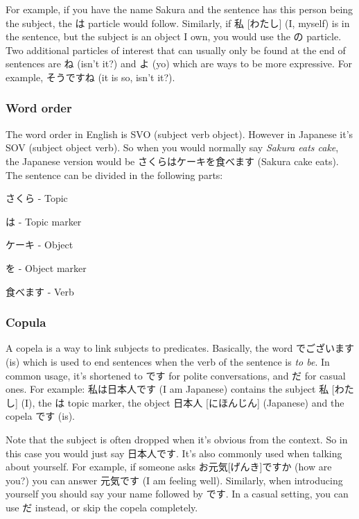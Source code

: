 \documentclass{article}
\begin{document}
\begin{CJK}{UTF8}{min}
\begin{multicols*}{3}
For example, if you have the name Sakura and the sentence has this person being the subject, the は particle would follow. Similarly, if 私 [わたし] (I, myself) is in the sentence, 
but the subject is an object I own, you would use the の particle. Two additional particles of interest that can usually only be found at the end of sentences are ね (isn't it?) and 
よ (yo) which are ways to be more expressive. For example, そうですね (it is so, isn't it?).

\subsubsection{Word order}

The word order in English is SVO (subject verb object). However in Japanese it's SOV (subject object verb). So when you would normally say \textit{Sakura eats cake}, the Japanese 
version would be さくらはケーキを食べます (Sakura cake eats). The sentence can be divided in the following parts:

\begin{colorize}
\item さくら - Topic
\item は - Topic marker
\item ケーキ - Object
\item を - Object marker
\item 食べます - Verb
\end{colorize}

\subsubsection{Copula}

A copela is a way to link subjects to predicates. Basically, the word でございます (is) which is used to end sentences when the verb of the sentence is \textit{to be}. In common usage, 
it's shortened to です for polite conversations, and だ for casual ones. For example: 私は日本人です (I am Japanese) contains the subject 私 [わたし] (I), the は topic marker, the 
object 日本人 [にほんじん] (Japanese) and the copela です (is).

Note that the subject is often dropped when it's obvious from the context. So in this case you would just say 日本人です. It's also commonly used when talking about yourself. For 
example, if someone asks お元気[げんき]ですか (how are you?) you can answer 元気です (I am feeling well). Similarly, when introducing yourself you should say your name followed by 
です. In a casual setting, you can use だ instead, or skip the copela completely.


\end{multicols*}
\end{CJK}
\end{document}
